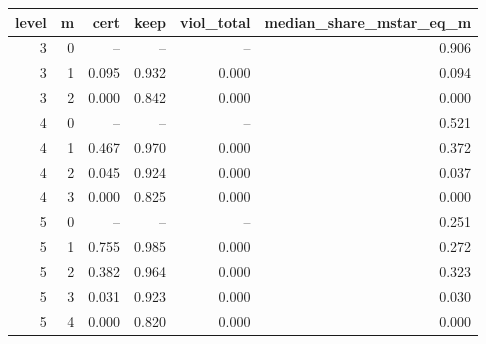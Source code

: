 \begin{tabular}{rrrrrr}
\toprule
level & m & cert & keep & viol_total & median_share_mstar_eq_m \\
\midrule
3 & 0 & -- & -- & -- & 0.906 \\
3 & 1 & 0.095 & 0.932 & 0.000 & 0.094 \\
3 & 2 & 0.000 & 0.842 & 0.000 & 0.000 \\
4 & 0 & -- & -- & -- & 0.521 \\
4 & 1 & 0.467 & 0.970 & 0.000 & 0.372 \\
4 & 2 & 0.045 & 0.924 & 0.000 & 0.037 \\
4 & 3 & 0.000 & 0.825 & 0.000 & 0.000 \\
5 & 0 & -- & -- & -- & 0.251 \\
5 & 1 & 0.755 & 0.985 & 0.000 & 0.272 \\
5 & 2 & 0.382 & 0.964 & 0.000 & 0.323 \\
5 & 3 & 0.031 & 0.923 & 0.000 & 0.030 \\
5 & 4 & 0.000 & 0.820 & 0.000 & 0.000 \\
\bottomrule
\end{tabular}
